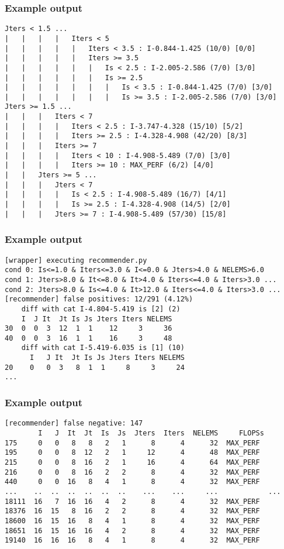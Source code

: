 \documentclass[xcolor=table,hideothersubsections,aspectratio=1610]{beamer}
\begin{document}
\begin{frame}[fragile]
    \frametitle{Example output}
    \begin{verbatim}
Jters < 1.5 ...
|   |   |   |   Iters < 5
|   |   |   |   |   Iters < 3.5 : I-0.844-1.425 (10/0) [0/0]
|   |   |   |   |   Iters >= 3.5
|   |   |   |   |   |   Is < 2.5 : I-2.005-2.586 (7/0) [3/0]
|   |   |   |   |   |   Is >= 2.5
|   |   |   |   |   |   |   Is < 3.5 : I-0.844-1.425 (7/0) [3/0]
|   |   |   |   |   |   |   Is >= 3.5 : I-2.005-2.586 (7/0) [3/0]
Jters >= 1.5 ...
|   |   |   Iters < 7
|   |   |   |   Iters < 2.5 : I-3.747-4.328 (15/10) [5/2]
|   |   |   |   Iters >= 2.5 : I-4.328-4.908 (42/20) [8/3]
|   |   |   Iters >= 7
|   |   |   |   Iters < 10 : I-4.908-5.489 (7/0) [3/0]
|   |   |   |   Iters >= 10 : MAX_PERF (6/2) [4/0]
|   |   Jters >= 5 ...
|   |   |   Jters < 7
|   |   |   |   Is < 2.5 : I-4.908-5.489 (16/7) [4/1]
|   |   |   |   Is >= 2.5 : I-4.328-4.908 (14/5) [2/0]
|   |   |   Jters >= 7 : I-4.908-5.489 (57/30) [15/8]

\end{verbatim}
\end{frame}

\begin{frame}[fragile]
    \frametitle{Example output}
    \begin{verbatim}
[wrapper] executing recommender.py
cond 0: Is<=1.0 & Iters<=3.0 & I<=0.0 & Jters>4.0 & NELEMS>6.0 
cond 1: Jters>8.0 & It<=8.0 & It>4.0 & Iters<=4.0 & Iters>3.0 ...
cond 2: Jters>8.0 & Is<=4.0 & It>12.0 & Iters<=4.0 & Iters>3.0 ...
[recommender] false positives: 12/291 (4.12%)
	diff with cat I-4.804-5.419 is [2] (2)
    I  J It  Jt Is Js Jters Iters NELEMS
30  0  0  3  12  1  1    12     3     36
40  0  0  3  16  1  1    16     3     48
	diff with cat I-5.419-6.035 is [1] (10)
      I   J It  Jt Is Js Jters Iters NELEMS
20    0   0  3   8  1  1     8     3     24
...

\end{verbatim}
\end{frame}

\begin{frame}[fragile]
    \frametitle{Example output}
    \begin{verbatim}
[recommender] false negative: 147 
        I   J  It  Jt  Is  Js  Jters  Iters  NELEMS     FLOPSs
175     0   0   8   8   2   1      8      4      32  MAX_PERF
195     0   0   8  12   2   1     12      4      48  MAX_PERF
215     0   0   8  16   2   1     16      4      64  MAX_PERF
216     0   0   8  16   2   2      8      4      32  MAX_PERF
440     0   0  16   8   4   1      8      4      32  MAX_PERF
...    ..  ..  ..  ..  ..  ..    ...    ...     ...            ...
18111  16   7  16  16   4   2      8      4      32  MAX_PERF
18376  16  15   8  16   2   2      8      4      32  MAX_PERF
18600  16  15  16   8   4   1      8      4      32  MAX_PERF
18651  16  15  16  16   4   2      8      4      32  MAX_PERF
19140  16  16  16   8   4   1      8      4      32  MAX_PERF


\end{verbatim}
\end{frame}
\end{document}
